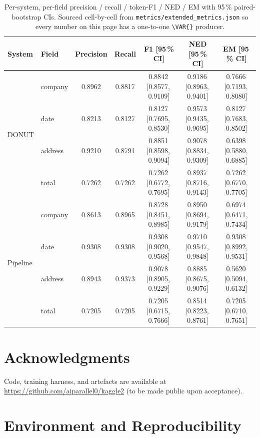 \documentclass[conference]{IEEEtran}
\begin{document}
\begin{table}[t]
\centering
\caption{Per-system, per-field precision / recall / token-F1 / NED /
  EM with 95\,\% paired-bootstrap CIs.  Sourced cell-by-cell from
  \texttt{metrics/extended\_metrics.json} so every number on this
  page has a one-to-one \texttt{\textbackslash VAR\{\}} producer.}
\label{tab:per_field_extended}
\small
\begin{tabular}{llccccc}\toprule
System & Field & Precision & Recall & F1 [95\,\% CI] & NED [95\,\% CI] & EM [95\,\% CI] \\ \midrule
\multirow{4}{*}{DONUT}
 & company  & 0.8962 & 0.8817
   & 0.8842\,[0.8577,\,0.9109]
   & 0.9186\,[0.8963,\,0.9401]
   & 0.7666\,[0.7193,\,0.8080] \\
 & date     & 0.8213 & 0.8127
   & 0.8127\,[0.7695,\,0.8530]
   & 0.9573\,[0.9435,\,0.9695]
   & 0.8127\,[0.7683,\,0.8502] \\
 & address  & 0.9210 & 0.8791
   & 0.8851\,[0.8598,\,0.9094]
   & 0.9078\,[0.8834,\,0.9309]
   & 0.6398\,[0.5880,\,0.6885] \\
 & total    & 0.7262 & 0.7262
   & 0.7262\,[0.6772,\,0.7695]
   & 0.8937\,[0.8716,\,0.9143]
   & 0.7262\,[0.6770,\,0.7705] \\ \midrule
\multirow{4}{*}{Pipeline}
 & company  & 0.8613 & 0.8965
   & 0.8728\,[0.8451,\,0.8985]
   & 0.8950\,[0.8694,\,0.9179]
   & 0.6974\,[0.6471,\,0.7434] \\
 & date     & 0.9308 & 0.9308
   & 0.9308\,[0.9020,\,0.9568]
   & 0.9710\,[0.9547,\,0.9848]
   & 0.9308\,[0.8992,\,0.9531] \\
 & address  & 0.8943 & 0.9373
   & 0.9078\,[0.8905,\,0.9229]
   & 0.8885\,[0.8675,\,0.9076]
   & 0.5620\,[0.5094,\,0.6132] \\
 & total    & 0.7205 & 0.7205
   & 0.7205\,[0.6715,\,0.7666]
   & 0.8514\,[0.8223,\,0.8761]
   & 0.7205\,[0.6710,\,0.7651] \\
\bottomrule
\end{tabular}
\end{table}

\section*{Acknowledgments}

Code, training harness, and artefacts are available at
\url{https://github.com/aiparallel0/kaggle2} (to be made public upon
acceptance).

\section{Environment and Reproducibility}
\label{sec:appendix_env}
\end{document}
